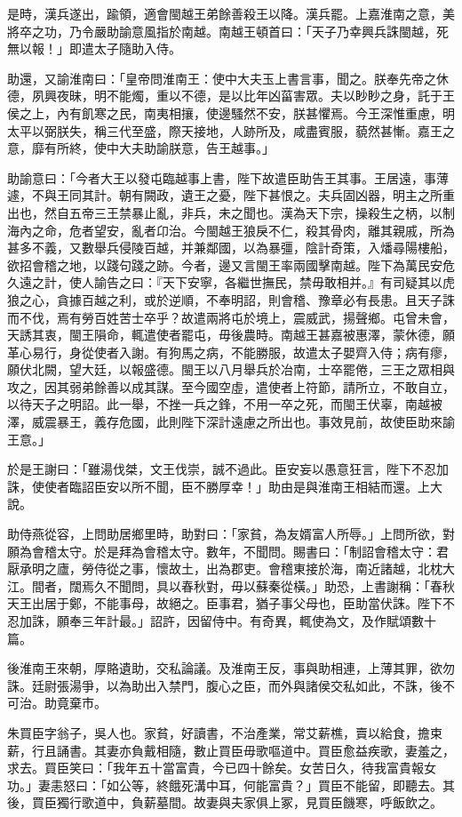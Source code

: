 \begin{pinyinscope}
是時，漢兵遂出，踰領，適會閩越王弟餘善殺王以降。漢兵罷。上嘉淮南之意，美將卒之功，乃令嚴助諭意風指於南越。南越王頓首曰：「天子乃幸興兵誅閩越，死無以報！」即遣太子隨助入侍。

助還，又諭淮南曰：「皇帝問淮南王：使中大夫玉上書言事，聞之。朕奉先帝之休德，夙興夜昧，明不能燭，重以不德，是以比年凶菑害眾。夫以眇眇之身，託于王侯之上，內有飢寒之民，南夷相攘，使邊騷然不安，朕甚懼焉。今王深惟重慮，明太平以弼朕失，稱三代至盛，際天接地，人跡所及，咸盡賓服，藐然甚慚。嘉王之意，靡有所終，使中大夫助諭朕意，告王越事。」

助諭意曰：「今者大王以發屯臨越事上書，陛下故遣臣助告王其事。王居遠，事薄遽，不與王同其計。朝有闕政，遺王之憂，陛下甚恨之。夫兵固凶器，明主之所重出也，然自五帝三王禁暴止亂，非兵，未之聞也。漢為天下宗，操殺生之柄，以制海內之命，危者望安，亂者卬治。今閩越王狼戾不仁，殺其骨肉，離其親戚，所為甚多不義，又數舉兵侵陵百越，并兼鄰國，以為暴彊，陰計奇策，入燔尋陽樓船，欲招會稽之地，以踐句踐之跡。今者，邊又言閩王率兩國擊南越。陛下為萬民安危久遠之計，使人諭告之曰：『天下安寧，各繼世撫民，禁毋敢相并。』有司疑其以虎狼之心，貪據百越之利，或於逆順，不奉明詔，則會稽、豫章必有長患。且天子誅而不伐，焉有勞百姓苦士卒乎？故遣兩將屯於境上，震威武，揚聲鄉。屯曾未會，天誘其衷，閩王隕命，輒遣使者罷屯，毋後農時。南越王甚嘉被惠澤，蒙休德，願革心易行，身從使者入謝。有狗馬之病，不能勝服，故遣太子嬰齊入侍；病有瘳，願伏北闕，望大廷，以報盛德。閩王以八月舉兵於冶南，士卒罷倦，三王之眾相與攻之，因其弱弟餘善以成其謀。至今國空虛，遣使者上符節，請所立，不敢自立，以待天子之明詔。此一舉，不挫一兵之鋒，不用一卒之死，而閩王伏辜，南越被澤，威震暴王，義存危國，此則陛下深計遠慮之所出也。事效見前，故使臣助來諭王意。」

於是王謝曰：「雖湯伐桀，文王伐崇，誠不過此。臣安妄以愚意狂言，陛下不忍加誅，使使者臨詔臣安以所不聞，臣不勝厚幸！」助由是與淮南王相結而還。上大說。

助侍燕從容，上問助居鄉里時，助對曰：「家貧，為友婿富人所辱。」上問所欲，對願為會稽太守。於是拜為會稽太守。數年，不聞問。賜書曰：「制詔會稽太守：君厭承明之廬，勞侍從之事，懷故土，出為郡吏。會稽東接於海，南近諸越，北枕大江。間者，闊焉久不聞問，具以春秋對，毋以蘇秦從橫。」助恐，上書謝稱：「春秋天王出居于鄭，不能事母，故絕之。臣事君，猶子事父母也，臣助當伏誅。陛下不忍加誅，願奉三年計最。」詔許，因留侍中。有奇異，輒使為文，及作賦頌數十篇。

後淮南王來朝，厚賂遺助，交私論議。及淮南王反，事與助相連，上薄其罪，欲勿誅。廷尉張湯爭，以為助出入禁門，腹心之臣，而外與諸侯交私如此，不誅，後不可治。助竟棄市。

朱買臣字翁子，吳人也。家貧，好讀書，不治產業，常艾薪樵，賣以給食，擔束薪，行且誦書。其妻亦負戴相隨，數止買臣毋歌嘔道中。買臣愈益疾歌，妻羞之，求去。買臣笑曰：「我年五十當富貴，今已四十餘矣。女苦日久，待我富貴報女功。」妻恚怒曰：「如公等，終餓死溝中耳，何能富貴？」買臣不能留，即聽去。其後，買臣獨行歌道中，負薪墓間。故妻與夫家俱上冢，見買臣饑寒，呼飯飲之。


\end{pinyinscope}
